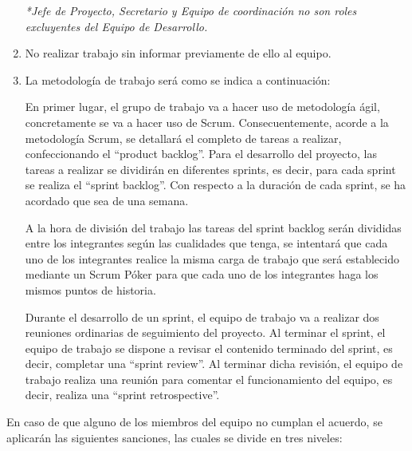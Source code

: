 \documentclass[]{article}
\begin{document}
\begin{enumerate}
\begin{itemize}
\begin{itemize}
		\end{itemize}
		
	\end{itemize}
	
	\begin{center}

	\textit{*Jefe de Proyecto, Secretario y Equipo de coordinación no son roles excluyentes del Equipo de Desarrollo.}

	\end{center}
	
	\item{No realizar trabajo sin informar previamente de ello al equipo.}
	
	\item{La metodología de trabajo será como se indica a continuación:}
	
En primer lugar, el grupo de trabajo va a hacer uso de metodología ágil, concretamente se va a hacer uso de Scrum. Consecuentemente, acorde a la metodología Scrum, se detallará el completo de tareas a realizar, confeccionando el “product backlog”. Para el desarrollo del proyecto, las tareas a realizar se dividirán en diferentes sprints, es decir, para cada sprint se realiza el “sprint backlog”. Con respecto a la duración de cada sprint, se ha acordado que sea de una semana.

A la hora de división del trabajo las tareas del sprint backlog serán divididas entre los integrantes según las cualidades que tenga, se intentará que cada uno de los integrantes realice la misma carga de trabajo que será establecido mediante un Scrum Póker para que cada uno de los integrantes haga los mismos puntos de historia.

Durante el desarrollo de un sprint, el equipo de trabajo va a realizar dos reuniones ordinarias de seguimiento del proyecto. Al terminar el sprint, el equipo de trabajo se dispone a revisar el contenido terminado del sprint, es decir, completar una “sprint review”. Al terminar dicha revisión, el equipo de trabajo realiza una reunión para comentar el funcionamiento del equipo, es decir, realiza una “sprint retrospective”.

\end{enumerate}

\clearpage

En caso de que alguno de los miembros del equipo no cumplan el acuerdo, se aplicarán las siguientes sanciones, las cuales se divide en tres niveles:
\end{document}
